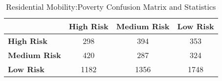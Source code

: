 \begin{table}[!htbp]
    \small
    \centering
    \caption{Residential Mobility:Poverty Confusion Matrix and Statistics}
    \label{tab:trans_pov_confusion}
    \begin{tabular}{lccc}
        \toprule
        & \textbf{High Risk} & \textbf{Medium Risk} & \textbf{Low Risk} \\
        \midrule
        \textbf{High Risk} & 298 & 394 & 353 \\
        \textbf{Medium Risk} & 420 & 287 & 324 \\
        \textbf{Low Risk} & 1182 & 1356 & 1748 \\
        \bottomrule

    \end{tabular}
\end{table}